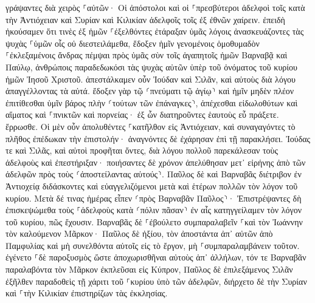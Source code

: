 \documentclass[twoside, 9pt]{extreport}
\begin{document}
γράψαντες διὰ χειρὸς ⸀αὐτῶν· Οἱ ἀπόστολοι καὶ οἱ ⸀πρεσβύτεροι ἀδελφοὶ τοῖς κατὰ τὴν Ἀντιόχειαν καὶ Συρίαν καὶ Κιλικίαν ἀδελφοῖς τοῖς ἐξ ἐθνῶν χαίρειν. 
ἐπειδὴ ἠκούσαμεν ὅτι τινὲς ἐξ ἡμῶν ⸀ἐξελθόντες ἐτάραξαν ὑμᾶς λόγοις ἀνασκευάζοντες τὰς ψυχὰς ⸀ὑμῶν οἷς οὐ διεστειλάμεθα, 
ἔδοξεν ἡμῖν γενομένοις ὁμοθυμαδὸν ⸀ἐκλεξαμένοις ἄνδρας πέμψαι πρὸς ὑμᾶς σὺν τοῖς ἀγαπητοῖς ἡμῶν Βαρναβᾷ καὶ Παύλῳ, 
ἀνθρώποις παραδεδωκόσι τὰς ψυχὰς αὐτῶν ὑπὲρ τοῦ ὀνόματος τοῦ κυρίου ἡμῶν Ἰησοῦ Χριστοῦ. 
ἀπεστάλκαμεν οὖν Ἰούδαν καὶ Σιλᾶν, καὶ αὐτοὺς διὰ λόγου ἀπαγγέλλοντας τὰ αὐτά. 
ἔδοξεν γὰρ τῷ ⸂πνεύματι τῷ ἁγίῳ⸃ καὶ ἡμῖν μηδὲν πλέον ἐπιτίθεσθαι ὑμῖν βάρος πλὴν ⸂τούτων τῶν ἐπάναγκες⸃, 
ἀπέχεσθαι εἰδωλοθύτων καὶ αἵματος καὶ ⸀πνικτῶν καὶ πορνείας· ἐξ ὧν διατηροῦντες ἑαυτοὺς εὖ πράξετε. ἔρρωσθε. 
Οἱ μὲν οὖν ἀπολυθέντες ⸀κατῆλθον εἰς Ἀντιόχειαν, καὶ συναγαγόντες τὸ πλῆθος ἐπέδωκαν τὴν ἐπιστολήν· 
ἀναγνόντες δὲ ἐχάρησαν ἐπὶ τῇ παρακλήσει. 
Ἰούδας τε καὶ Σιλᾶς, καὶ αὐτοὶ προφῆται ὄντες, διὰ λόγου πολλοῦ παρεκάλεσαν τοὺς ἀδελφοὺς καὶ ἐπεστήριξαν· 
ποιήσαντες δὲ χρόνον ἀπελύθησαν μετ᾽ εἰρήνης ἀπὸ τῶν ἀδελφῶν πρὸς τοὺς ⸂ἀποστείλαντας αὐτούς⸃. 
Παῦλος δὲ καὶ Βαρναβᾶς διέτριβον ἐν Ἀντιοχείᾳ διδάσκοντες καὶ εὐαγγελιζόμενοι μετὰ καὶ ἑτέρων πολλῶν τὸν λόγον τοῦ κυρίου. 
Μετὰ δέ τινας ἡμέρας εἶπεν ⸂πρὸς Βαρναβᾶν Παῦλος⸃· Ἐπιστρέψαντες δὴ ἐπισκεψώμεθα τοὺς ⸀ἀδελφοὺς κατὰ ⸂πόλιν πᾶσαν⸃ ἐν αἷς κατηγγείλαμεν τὸν λόγον τοῦ κυρίου, πῶς ἔχουσιν. 
Βαρναβᾶς δὲ ⸀ἐβούλετο συμπαραλαβεῖν ⸀καὶ τὸν Ἰωάννην τὸν καλούμενον Μᾶρκον· 
Παῦλος δὲ ἠξίου, τὸν ἀποστάντα ἀπ᾽ αὐτῶν ἀπὸ Παμφυλίας καὶ μὴ συνελθόντα αὐτοῖς εἰς τὸ ἔργον, μὴ ⸀συμπαραλαμβάνειν τοῦτον. 
ἐγένετο ⸀δὲ παροξυσμὸς ὥστε ἀποχωρισθῆναι αὐτοὺς ἀπ᾽ ἀλλήλων, τόν τε Βαρναβᾶν παραλαβόντα τὸν Μᾶρκον ἐκπλεῦσαι εἰς Κύπρον, 
Παῦλος δὲ ἐπιλεξάμενος Σιλᾶν ἐξῆλθεν παραδοθεὶς τῇ χάριτι τοῦ ⸀κυρίου ὑπὸ τῶν ἀδελφῶν, 
διήρχετο δὲ τὴν Συρίαν καὶ ⸀τὴν Κιλικίαν ἐπιστηρίζων τὰς ἐκκλησίας. 
\end{document}
